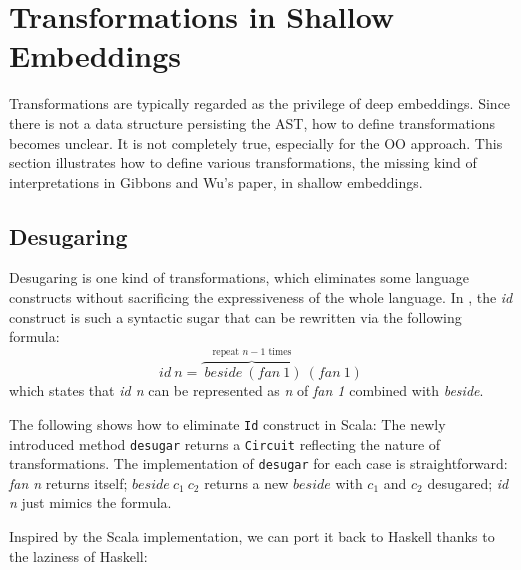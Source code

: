 \section{Transformations in Shallow Embeddings}
Transformations are typically regarded as the privilege of deep embeddings.
Since there is not a data structure persisting the AST, how to define transformations
becomes unclear.
It is not completely true, especially for the OO approach.
This section illustrates how to define various transformations, the missing
kind of interpretations in Gibbons and Wu's paper, in shallow embeddings.

\subsection{Desugaring}
Desugaring is one kind of transformations, which eliminates some
language constructs without sacrificing the expressiveness of the whole language.
In \dsl, the \emph{id} construct is such a syntactic sugar that can
be rewritten via the following formula:
$$id\ n = \overbrace{\ beside\ (fan\ 1)}^{\text{repeat }n-1\text{ times}}\ (fan\ 1)$$
which states that \emph{id n} can be represented as \emph{n} of \emph{fan 1} combined with \emph{beside}.

The following shows how to eliminate \lstinline{Id} construct in Scala:
The newly introduced method \lstinline{desugar} returns a
\lstinline{Circuit} reflecting the nature of transformations. The implementation of \lstinline{desugar} for each case is
straightforward: \emph{fan n} returns itself; $beside\ c_1\ c_2$ returns a new
$beside$ with $c_1$ and $c_2$ desugared; \emph{id n} just mimics the formula.

Inspired by the Scala implementation, we can port it back to Haskell thanks to
the laziness of Haskell:

